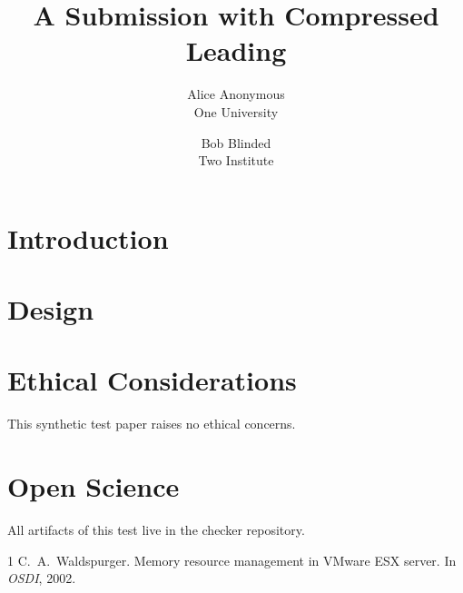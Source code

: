 \documentclass[letterpaper,twocolumn,10pt]{article}
\date{}
\title{\Large \bf A Submission with Compressed Leading}
\author{{\rm Alice Anonymous}\\One University \and {\rm Bob Blinded}\\Two Institute}
\begin{document}
\maketitle

\begin{abstract}
\lipsum[1][1-5]
\end{abstract}

\section{Introduction}
\lipsum[2-4]

\section{Design}
\lipsum[5-7]

\appendix
\section*{Ethical Considerations}
This synthetic test paper raises no ethical concerns.

\section*{Open Science}
All artifacts of this test live in the checker repository.

\begin{thebibliography}{1}
 C.~A.\ Waldspurger. Memory resource management in VMware ESX
  server. In \emph{OSDI}, 2002.
\end{thebibliography}
\end{document}
